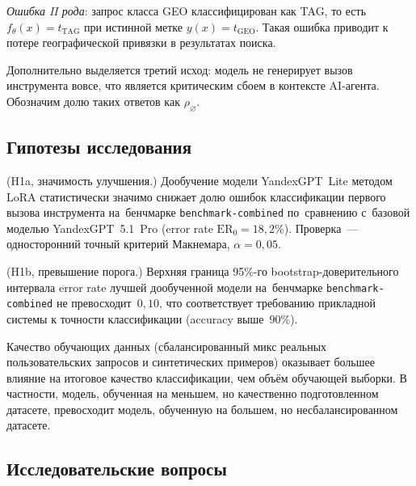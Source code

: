 \begin{definition}
\emph{Ошибка II рода}: запрос класса GEO классифицирован как TAG, то есть $f_\theta(x) = t_{\mathrm{TAG}}$ при истинной метке $y(x) = t_{\mathrm{GEO}}$. Такая ошибка приводит к потере географической привязки в результатах поиска.
\end{definition}

Дополнительно выделяется третий исход: модель не генерирует вызов инструмента вовсе, что является критическим сбоем в контексте AI-агента. Обозначим долю таких ответов как $\rho_{\varnothing}$.

\subsection{Гипотезы исследования}

\begin{hypothesis}\label{hyp:lora_significance}
(H1a, значимость улучшения.) Дообучение модели YandexGPT~Lite методом LoRA статистически значимо снижает долю ошибок классификации первого вызова инструмента на~бенчмарке \texttt{benchmark-combined} по~сравнению с~базовой моделью YandexGPT~5.1~Pro (error rate $\mathrm{ER}_0 = 18{,}2\%$). Проверка~--- односторонний точный критерий Макнемара, $\alpha = 0{,}05$.
\end{hypothesis}

\begin{hypothesis}\label{hyp:lora_threshold}
(H1b, превышение порога.) Верхняя граница 95\%-го bootstrap-доверительного интервала error rate лучшей дообученной модели на~бенчмарке \texttt{benchmark-combined} не превосходит~$0{,}10$, что соответствует требованию прикладной системы к точности классификации (accuracy выше~$90\%$).
\end{hypothesis}

\begin{hypothesis}\label{hyp:data_quality}
Качество обучающих данных (сбалансированный микс реальных пользовательских запросов и синтетических примеров) оказывает большее влияние на итоговое качество классификации, чем объём обучающей выборки. В частности, модель, обученная на меньшем, но качественно подготовленном датасете, превосходит модель, обученную на большем, но несбалансированном датасете.
\end{hypothesis}

\subsection{Исследовательские вопросы}

